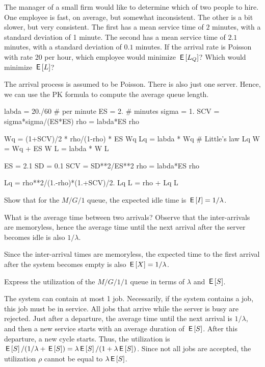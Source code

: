 \documentclass[companion]{subfiles}
\begin{document}
\begin{exercise}[Hall 5.16] 
The manager of a small firm would like to determine which of two people to hire.
 One employee is fast, on average, but somewhat inconsistent.
 The other is a bit slower, but very consistent.
 The first has a mean service time of $2$ minutes, with a standard deviation of 1 minute.
 The second has a mean service time of $2.1$ minutes, with a standard deviation of $0.1$ minutes.
 If the arrival rate is Poisson with rate 20 per hour, which employee would minimize $\,\mathsf{E}\left[L_Q\right]$?
 Which would minimize $\,\mathsf{E}\left[L\right]$?
\begin{solution}
 The arrival process is assumed to be Poisson. There is also
 just one server. Hence, we can use the PK formula to compute the average queue length.

\begin{pyconsole}
labda = 20./60 # per minute
ES = 2. # minutes
sigma = 1.
SCV = sigma*sigma/(ES*ES)
rho = labda*ES
rho

Wq = (1+SCV)/2 * rho/(1-rho) * ES
Wq
Lq = labda * Wq # Little's law
Lq
W = Wq + ES
W
L = labda * W
L
\end{pyconsole}


\begin{pyconsole}
ES = 2.1
SD = 0.1
SCV = SD**2/ES**2
rho = labda*ES
rho

Lq = rho**2/(1.-rho)*(1.+SCV)/2.
Lq
L = rho + Lq
L
\end{pyconsole}

\end{solution}
\end{exercise}


\begin{extra}
 Show that for the $M/G/1$ queue, the expected idle time is
 $\,\mathsf{E}\left[I\right] = 1/\lambda$. 
\begin{hint}
What is the average time between two
 arrivals? Observe that the inter-arrivals are memoryless, hence the
 average time until the next arrival after the server becomes idle
 is also $1/\lambda$.
\end{hint}
\begin{solution}
 Since the inter-arrival times are memoryless, the expected time to the first arrival after the system becomes empty is also $\,\mathsf{E}\left[X\right]=1/\lambda$.
\end{solution}
\end{extra}

\begin{extra}
 Express the utilization of the $M/G/1/1$ queue in terms of $\lambda$ and $\,\mathsf{E}\left[S\right]$.
\begin{solution}
 The system can contain at most 1 job.
 Necessarily, if the system contains a job, this job must be in service.
 All jobs that arrive while the server is busy are rejected.
 Just after a departure, the average time until the next arrival is $1/\lambda$, and then a new service starts with an average duration of $\,\mathsf{E}\left[S\right]$.
 After this departure, a new cycle starts.
 Thus, the utilization is $\,\mathsf{E}\left[S\right]/(1/\lambda + \,\mathsf{E}\left[S\right]) = \lambda \,\mathsf{E}\left[S\right]/ (1 + \lambda \,\mathsf{E}\left[S\right])$.
 Since not all jobs are accepted, the utilization $\rho$ cannot be equal to $\lambda \,\mathsf{E}\left[S\right]$.
\end{solution}
\end{extra}
\end{document}
